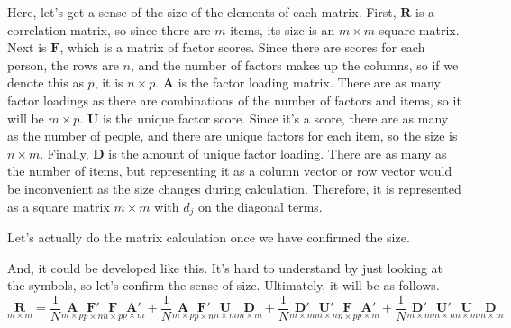 \documentclass{ltjsbook}
\begin{document}
Here, let's get a sense of the size of the elements of each matrix. First, $\bm{R}$ is a correlation matrix, so since there are $m$ items, its size is an $m \times m$ square matrix. Next is $\bm{F}$, which is a matrix of factor scores. Since there are scores for each person, the rows are $n$, and the number of factors makes up the columns, so if we denote this as $p$, it is $n\times p$. $\bm{A}$ is the factor loading matrix. There are as many factor loadings as there are combinations of the number of factors and items, so it will be $m \times p$. $\bm{U}$ is the unique factor score. Since it's a score, there are as many as the number of people, and there are unique factors for each item, so the size is $n \times m$. Finally, $\bm{D}$ is the amount of unique factor loading. There are as many as the number of items, but representing it as a column vector or row vector would be inconvenient as the size changes during calculation. Therefore, it is represented as a square matrix $m \times m$ with $d_j$ on the diagonal terms.

Let's actually do the matrix calculation once we have confirmed the size.


And, it could be developed like this. It's hard to understand by just looking at the symbols, so let's confirm the sense of size. Ultimately, it will be as follows.
\[
	\underset{m \times m}{\bm{R}} =
	\frac{1}{N} \underset{m \times p}{\bm{A}} \underset{p \times n}{\bm{F}'} \underset{n \times p}{\bm{F}} \underset{p \times m}{\bm{A}'} +
	\frac{1}{N} \underset{m \times p}{\bm{A}} \underset{p \times n}{\bm{F}'} \underset{n \times m}{\bm{U}} \underset{m \times m}{\bm{D}} +
	\frac{1}{N} \underset{m \times m}{\bm{D}'} \underset{m \times n}{\bm{U}'} \underset{n \times p}{\bm{F}} \underset{p \times m}{\bm{A}'} +
	\frac{1}{N} \underset{m \times m}{\bm{D}'} \underset{m \times n}{\bm{U}'} \underset{n \times m}{\bm{U}} \underset{m \times m}{\bm{D}}
\]
\end{document}
